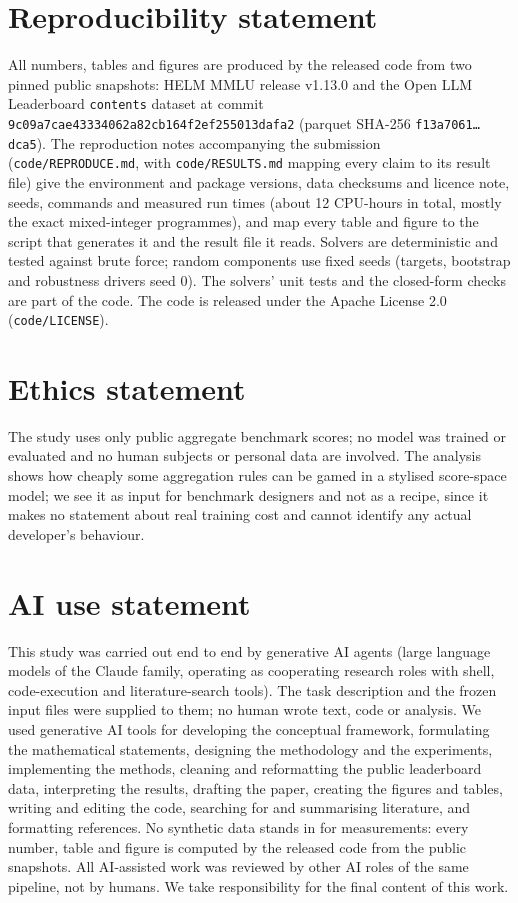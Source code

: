 \section*{Reproducibility statement}
All numbers, tables and figures are produced by the released code from two pinned public snapshots: HELM MMLU release v1.13.0 and the Open LLM Leaderboard \texttt{contents} dataset at commit \texttt{9c09a7cae43334062a82cb164f2ef255013dafa2} (parquet SHA-256 \texttt{f13a7061\ldots dca5}). The reproduction notes accompanying the submission (\texttt{code/REPRODUCE.md}, with \texttt{code/RESULTS.md} mapping every claim to its result file) give the environment and package versions, data checksums and licence note, seeds, commands and measured run times (about 12 CPU-hours in total, mostly the exact mixed-integer programmes), and map every table and figure to the script that generates it and the result file it reads. Solvers are deterministic and tested against brute force; random components use fixed seeds (targets, bootstrap and robustness drivers seed 0). The solvers' unit tests and the closed-form checks are part of the code. The code is released under the Apache License 2.0 (\texttt{code/LICENSE}).

\section*{Ethics statement}
The study uses only public aggregate benchmark scores; no model was trained or evaluated and no human subjects or personal data are involved. The analysis shows how cheaply some aggregation rules can be gamed in a stylised score-space model; we see it as input for benchmark designers and not as a recipe, since it makes no statement about real training cost and cannot identify any actual developer's behaviour.

\section*{AI use statement}
This study was carried out end to end by generative AI agents (large language models of the Claude family, operating as cooperating research roles with shell, code-execution and literature-search tools). The task description and the frozen input files were supplied to them; no human wrote text, code or analysis. We used generative AI tools for developing the conceptual framework, formulating the mathematical statements, designing the methodology and the experiments, implementing the methods, cleaning and reformatting the public leaderboard data, interpreting the results, drafting the paper, creating the figures and tables, writing and editing the code, searching for and summarising literature, and formatting references. No synthetic data stands in for measurements: every number, table and figure is computed by the released code from the public snapshots. All AI-assisted work was reviewed by other AI roles of the same pipeline, not by humans. We take responsibility for the final content of this work.

